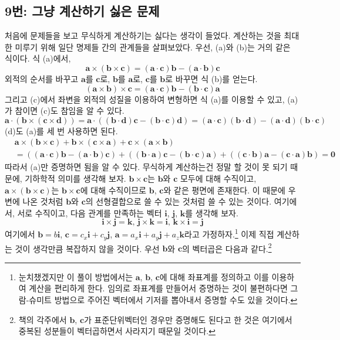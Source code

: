 \documentclass{scrartcl}
\begin{document}
\subsection{9번: 그냥 계산하기 싫은 문제}
처음에 문제들을 보고 무식하게 계산하기는 싫다는 생각이 들었다. 계산하는 것을 최대한 미루기 위해 일단 명제들 간의 관계들을 살펴보았다. 우선, (a)와 (b)는 거의 같은 식이다. 식 (a)에서,
\[\mathbf{a}\times(\mathbf{b}\times\mathbf{c})=(\mathbf{a}\cdot\mathbf{c})\mathbf{b}-(\mathbf{a}\cdot\mathbf{b})\mathbf{c}\]
외적의 순서를 바꾸고 \(\mathbf{a}\)를 \(\mathbf{c}\)로, \(\mathbf{b}\)를 \(\mathbf{a}\)로, \(\mathbf{c}\)를 \(\mathbf{b}\)로 바꾸면 식 (b)를 얻는다.
\[(\mathbf{a}\times\mathbf{b})\times\mathbf{c}=(\mathbf{a}\cdot\mathbf{c})\mathbf{b}-(\mathbf{b}\cdot\mathbf{c})\mathbf{a}\]
그리고 (c)에서 좌변을 외적의 성질을 이용하여 변형하면 식 (a)를 이용할 수 있고, (a)가 참이면 (c)도 참임을 알 수 있다.
\[\mathbf{a}\cdot(\mathbf{b}\times(\mathbf{c}\times\mathbf{d}))=\mathbf{a}\cdot((\mathbf{b}\cdot\mathbf{d})\mathbf{c}-(\mathbf{b}\cdot\mathbf{c})\mathbf{d})=(\mathbf{a}\cdot\mathbf{c})(\mathbf{b}\cdot\mathbf{d})-(\mathbf{a}\cdot\mathbf{d})(\mathbf{b}\cdot\mathbf{c})\]
(d)도 (a)를 세 번 사용하면 된다.
\begin{align*}
&\mathbf{a}\times(\mathbf{b}\times\mathbf{c})+\mathbf{b}\times(\mathbf{c}\times\mathbf{a})+\mathbf{c}\times(\mathbf{a}\times\mathbf{b}) \\
&=((\mathbf{a}\cdot\mathbf{c})\mathbf{b}-(\mathbf{a}\cdot\mathbf{b})\mathbf{c})+((\mathbf{b}\cdot\mathbf{a})\mathbf{c}-(\mathbf{b}\cdot\mathbf{c})\mathbf{a})+((\mathbf{c}\cdot\mathbf{b})\mathbf{a}-(\mathbf{c}\cdot\mathbf{a})\mathbf{b})=\mathbf{0}
\end{align*}
따라서 (a)만 증명하면 됨을 알 수 있다. 무식하게 계산하는건 정말 할 것이 못 되기 때문에, 기하학적 의미를 생각해 보자. \(\mathbf{b}\times\mathbf{c}\)는 \(\mathbf{b}\)와 \(\mathbf{c}\) 모두에 대해 수직이고, \(\mathbf{a}\times(\mathbf{b}\times\mathbf{c})\)는 \(\mathbf{b}\times\mathbf{c}\)에 대해 수직이므로 \(\mathbf{b}\), \(\mathbf{c}\)와 같은 평면에 존재한다. 이 때문에 우변에 나온 것처럼 \(\mathbf{b}\)와 \(\mathbf{c}\)의 선형결합으로 쓸 수 있는 것처럼 쓸 수 있는 것이다. 여기에서, 서로 수직이고, 다음 관계를 만족하는 벡터 \(\mathbf{i}\), \(\mathbf{j}\), \(\mathbf{k}\)를 생각해 보자.
\[\mathbf{i}\times\mathbf{j}=\mathbf{k},\,\mathbf{j}\times\mathbf{k}=\mathbf{i},\,\mathbf{k}\times\mathbf{i}=\mathbf{j}\]
여기에서 \(\mathbf{b}=b\mathbf{i}\), \(\mathbf{c}=c_x\mathbf{i}+c_y\mathbf{j}\), \(\mathbf{a}=a_x\mathbf{i}+a_y\mathbf{j}+a_z\mathbf{k}\)라고 가정하자.\footnote{눈치챘겠지만 이 풀이 방법에서는 \(\mathbf{a}\), \(\mathbf{b}\), \(\mathbf{c}\)에 대해 좌표계를 정의하고 이를 이용하여 계산을 편리하게 한다. 임의로 좌표계를 만들어서 증명하는 것이 불편하다면 그람-슈미트 방법으로 주어진 벡터에서 기저를 뽑아내서 증명할 수도 있을 것이다.} 이제 직접 계산하는 것이 생각만큼 복잡하지 않을 것이다. 우선 \(\mathbf{b}\)와 \(\mathbf{c}\)의 벡터곱은 다음과 같다.\footnote{책의 각주에서 \(\mathbf{b}\), \(\mathbf{c}\)가 표준단위벡터인 경우만 증명해도 된다고 한 것은 여기에서 중복된 성분들이 벡터곱하면서 사라지기 때문일 것이다.}
\end{document}
